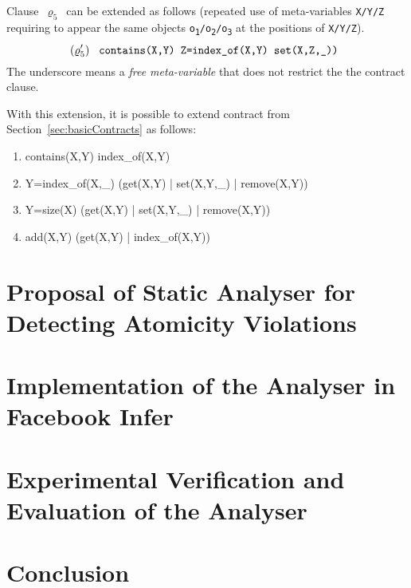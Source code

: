 Clause~$ \varrho_5 $~can be extended as follows (repeated use of 
meta-variables \texttt{X/Y/Z} requiring to appear the same objects
\texttt{o\textsubscript{1}/o\textsubscript{2}/o\textsubscript{3}} at the 
positions of \texttt{X/Y/Z}).
$$ 
    (\varrho^\prime_5)\ \text{\texttt{
        contains(X,Y) Z=index\_of(X,Y) set(X,Z,\_))
    }} 
$$
The underscore means a \emph{free meta-variable} that does not restrict
the the contract clause.

With this extension, it is possible to extend contract from 
Section~\ref{sec:basicContracts} as follows:
\begin{enumerate}[label={$ (\varrho^\prime_{\arabic*}) $}]
    \tt

    \item contains(X,Y) index\_of(X,Y)
    \item Y=index\_of(X,\_) (get(X,Y) | set(X,Y,\_) | remove(X,Y))
    \item Y=size(X) (get(X,Y) | set(X,Y,\_) | remove(X,Y))
    \item add(X,Y) (get(X,Y) | index\_of(X,Y))
\end{enumerate}



\chapter{Proposal of Static Analyser for Detecting Atomicity Violations}
\label{chap:proposal}



\chapter{Implementation of the Analyser in Facebook Infer}
\label{chap:implementation}



\chapter{Experimental Verification and Evaluation of the Analyser}
\label{chap:experiments}



\chapter{Conclusion}
\label{chap:conclusion}


